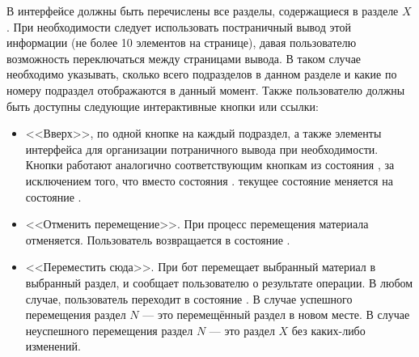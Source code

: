 \begin{enumerate}
                В интерфейсе должны быть перечислены все разделы, содержащиеся в разделе
                \(X\). При необходимости следует использовать постраничный вывод этой информации
                (не более 10 элементов на странице), давая пользователю возможность переключаться
                между страницами вывода. В таком случае необходимо указывать, сколько всего подразделов
                в данном разделе и какие по номеру подраздел отображаются в данный момент.
                Также пользователю должны быть доступны следующие интерактивные кнопки или ссылки:
                \begin{itemize}
                    \item
                        <<Вверх>>, по одной кнопке на каждый подраздел, а также
                        элементы интерфейса для организации потраничного вывода при необходимости.
                        Кнопки работают аналогично соответствующим кнопкам из состояния 
                        \hyperref[itm:req:ui:states:navx]
                        {}, за исключением того,
                        что вместо состояния
                        \hyperref[itm:req:ui:states:navx]
                        {}.
                        текущее состояние меняется на состояние
                        \hyperref[itm:req:ui:states:move-kbo]
                        {}.
                    \item
                        <<Отменить перемещение>>.
                        При  процесс перемещения материала отменяется.
                        Пользователь возвращается в состояние
                        \hyperref[itm:req:ui:states:navx]
                        {}.
                    \item
                        <<Переместить сюда>>.
                        При  бот перемещает выбранный материал в выбранный раздел,
                        и сообщает пользователю о результате операции. В любом случае, пользователь
                        переходит в состояние
                        \hyperref[itm:req:ui:states:navx]
                        {}.
                        В случае успешного перемещения раздел \(N\) --- это перемещённый раздел
                        в новом месте. В случае неуспешного перемещения раздел \(N\) --- это раздел \(X\)
                        без каких-либо изменений.
                \end{itemize}


\end{enumerate}
